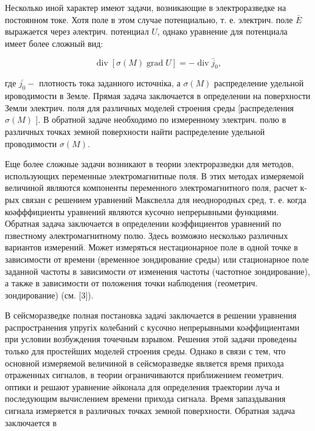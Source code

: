\documentclass[10pt]{article}
\begin{document}
Несколько иной характер имеют задачи, возникающие в электроразведке на постоянном токе. Хотя поле в этом случае потенциально, т. е. электрич. поле $\bar{E}$ выражается через әлектрич. потенциал $U$, однако уравнение для потенциала имеет более сложный вид:



\[

\operatorname{div}[\sigma(M) \operatorname{grad} U]=-\operatorname{div} \bar{j}_{0},

\]



где $\overline{j_{0}}-$ плотность тока заданного источніка, а $\sigma(M)$ распределение удельной ироводимости в Земле. Прямая задача заключается в определении на поверхности Земли электрич. поля для различных моделей строения среды [распределения $\sigma(M)$ ]. В обратной задаче необходимо по измеренному электрич. полю в различных точках земной поверхности найти распределение удельной проводимости $\sigma(M)$.



Еще более сложные задачи возникают в теории электроразведки для методов, использующих переменные электромагнитные поля. В этих методах измеряемой величиной являются компоненты переменного электромагнитного поля, расчет к-рых связан с решением уравнений Максвелла для неоднородных сред, т. е. когда коәфффициенты уравнений являются кусочно непрерывными функциями. Обратная задача заключается в определении коэффициентов уравнений по пзвестному әлектромагнитному полю. Здесь возможно несколько различных вариантов измерений. Может измеряться нестационарное поле в одной точке в зависимости от времени (временное зондирование среды) или стационарное поле заданной частоты в зависимости от изменения частоты (частотное зондирование), а также в зависимости от положения точки наблюдения (геометрич. зондирование) (см. [3]).



В сейсморазведке полная постановка задачі заключается в решении уравнения распространения упругіх колебаний с кусочно непрерывными коәффициентами при условии возбуждения точечным взрывом. Решения этой задачи проведены только для простейших моделей строения среды. Однако в связи с тем, что основной измеряемой величиной в сейсморазведке является время прихода отраженных сигналов, в теории ограничиваются приближением геометрич. оптики и решают уравнение әйконала для определения траектории луча и последующим вычислением времени прихода сигнала. Время запаздывания сигнала измеряется в различных точках земной поверхности. Обратная задача заключается в
\end{document}
